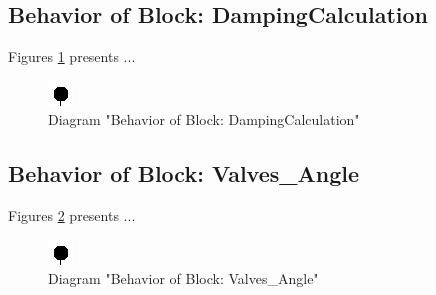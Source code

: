 \subsection{Behavior of Block: DampingCalculation}
Figures \ref{fig:DampingCalculationDampingCalculation26} presents ...
\begin{figure}[htb]
\centering
\includegraphics[width=\textwidth]{img_2_6.png}
\caption{Diagram "Behavior of Block: DampingCalculation"}
\label{fig:DampingCalculationDampingCalculation26}
\end{figure}

\subsection{Behavior of Block: Valves\_Angle}
Figures \ref{fig:ValvesAngleValvesAngle27} presents ...
\begin{figure}[htb]
\centering
\includegraphics[width=\textwidth]{img_2_7.png}
\caption{Diagram "Behavior of Block: Valves\_Angle"}
\label{fig:ValvesAngleValvesAngle27}
\end{figure}

